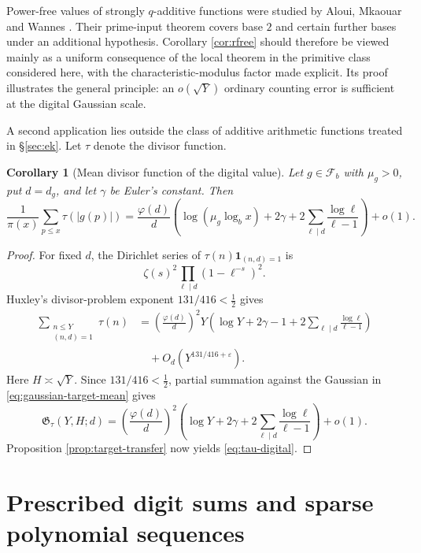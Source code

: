 \documentclass[11pt,reqno]{amsart}
\theoremstyle{plain}
\newtheorem{corollary}[theorem]{Corollary}
\theoremstyle{definition}
\newcommand{\eps}{\varepsilon}
\newcommand{\1}{\mathbf 1}
\begin{document}
Power-free values of strongly $q$-additive functions were studied by Aloui, Mkaouar and Wannes \cite{aloui}.  Their prime-input theorem covers base $2$ and certain further bases under an additional hypothesis.  Corollary \ref{cor:rfree} should therefore be viewed mainly as a uniform consequence of the local theorem in the primitive class considered here, with the characteristic-modulus factor made explicit.  Its proof illustrates the general principle: an $o(\sqrt Y)$ ordinary counting error is sufficient at the digital Gaussian scale.

A second application lies outside the class of additive arithmetic functions treated in \S\ref{sec:ek}.  Let $\tau$ denote the divisor function.

\begin{corollary}[Mean divisor function of the digital value]\label{cor:tau}
Let $g\in\mathcal F_b$ with $\mu_g>0$, put $d=d_g$, and let $\gamma$ be Euler's constant.  Then
\begin{equation}\label{eq:tau-digital}
 \frac1{\pi(x)}\sum_{p\le x}\tau(|g(p)|)
 =\frac{\varphi(d)}d
 \left(\log(\mu_g\log_bx)+2\gamma
 +2\sum_{\ell\mid d}\frac{\log\ell}{\ell-1}\right)+o(1).
\end{equation}
\end{corollary}

\begin{proof}
For fixed $d$, the Dirichlet series of $\tau(n)\1_{(n,d)=1}$ is
\[
 \zeta(s)^2\prod_{\ell\mid d}(1-\ell^{-s})^2.
\]
Huxley's divisor-problem exponent $131/416<\tfrac12$ \cite{huxley} gives
\begin{align*}
 \sum_{\substack{n\le Y\\(n,d)=1}}\tau(n)
 &=\left(\frac{\varphi(d)}d\right)^2Y
 \left(\log Y+2\gamma-1
 +2\sum_{\ell\mid d}\frac{\log\ell}{\ell-1}\right)\\
 &\quad+O_d(Y^{131/416+\eps}).
\end{align*}
Here $H\asymp\sqrt Y$.  Since $131/416<\tfrac12$, partial summation against the Gaussian in \eqref{eq:gaussian-target-mean} gives
\[
 \mathfrak G_\tau(Y,H;d)
 =\left(\frac{\varphi(d)}d\right)^2
 \left(\log Y+2\gamma
 +2\sum_{\ell\mid d}\frac{\log\ell}{\ell-1}\right)+o(1).
\]
Proposition \ref{prop:target-transfer} now yields \eqref{eq:tau-digital}.
\end{proof}

\section{Prescribed digit sums and sparse polynomial sequences}\label{sec:squares}
\end{document}
